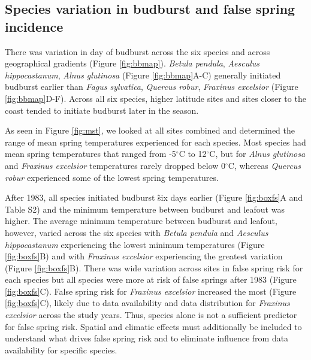 \documentclass{article}\usepackage[]{graphicx}\usepackage[]{color}
\begin{document}
\subsection*{Species variation in budburst and false spring incidence}
There was variation in day of budburst across the six species and across geographical gradients (Figure \ref{fig:bbmap}). \textit{Betula pendula}, \textit{Aesculus hippocastanum}, \textit{Alnus glutinosa} (Figure \ref{fig:bbmap}A-C) generally initiated budburst earlier than \textit{Fagus sylvatica}, \textit{Quercus robur}, \textit{Fraxinus excelsior} (Figure \ref{fig:bbmap}D-F). Across all six species, higher latitude sites and sites closer to the coast tended to initiate budburst later in the season. 

As seen in Figure \ref{fig:mst}, we looked at all sites combined and determined the range of mean spring temperatures experienced for each species. Most species had mean spring temperatures that ranged from -5$^{\circ}$C to 12$^{\circ}$C, but for \textit{Alnus glutinosa} and \textit{Fraxinus excelsior} temperatures rarely dropped below 0$^{\circ}$C, whereas \textit{Quercus robur} experienced some of the lowest spring temperatures. 

After 1983, all species initiated budburst \~ six days earlier (Figure \ref{fig:boxfs}A and Table S2) and the minimum temperature between budburst and leafout was higher.  The average minimum temperature between budburst and leafout, however, varied across the six species with \textit{Betula pendula} and \textit{Aesculus hippocastanum} experiencing the lowest minimum temperatures (Figure \ref{fig:boxfs}B) and with \textit{Fraxinus excelsior} experiencing the greatest variation (Figure \ref{fig:boxfs}B). There was wide variation across sites in false spring risk for each species but all species were more at risk of false springs after 1983 (Figure \ref{fig:boxfs}C). False spring risk for \textit{Fraxinus excelsior} increased the most (Figure \ref{fig:boxfs}C), likely due to data availability and data distribution for \textit{Fraxinus excelsior} across the study years. Thus, species alone is not a sufficient predictor for false spring risk. Spatial and climatic effects must additionally be included to understand what drives false spring risk and to eliminate influence from data availability for specific species. 
\end{document}
